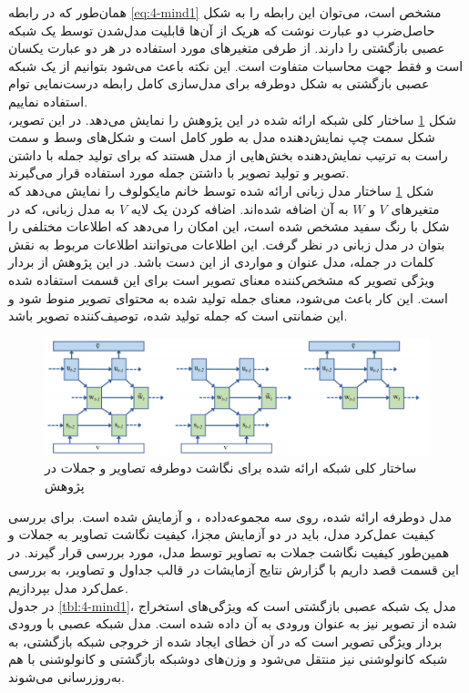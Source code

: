 همان‌طور که در رابطه \eqref{eq:4-mind1} مشخص است، می‌توان این رابطه را به شکل حاصل‌ضرب دو عبارت نوشت که هریک از آن‌ها قابلیت مدل‌شدن توسط یک شبکه عصبی بازگشتی را دارند. از طرفی متغیر‌های مورد استفاده در هر دو عبارت یکسان است و فقط جهت محاسبات متفاوت است. این نکته باعث می‌شود بتوانیم از یک شبکه عصبی بازگشتی به شکل دوطرفه برای مدل‌سازی کامل رابطه درست‌نمایی توام استفاده نماییم.
\\
شکل \ref{fig:4-mind1} ساختار کلی شبکه ارائه شده در این پژوهش را نمایش می‌دهد. در این تصویر، شکل سمت چپ نمایش‌دهنده مدل به طور کامل است و شکل‌های وسط و سمت راست به ترتیب نمایش‌دهنده بخش‌هایی از مدل هستند که برای تولید جمله با داشتن تصویر و تولید تصویر با داشتن جمله مورد استفاده قرار می‌گیرند.
\\
شکل \ref{fig:4-mind1} ساختار مدل زبانی ارائه شده توسط خانم مایکولوف را نمایش می‌دهد که متغیرهای $V$ و $W$ به آن اضافه شده‌اند. اضافه کردن یک لایه $V$ به مدل زبانی، که در شکل با رنگ سفید مشخص شده است، این امکان را می‌دهد که اطلاعات مختلفی را بتوان در مدل زبانی در نظر گرفت. این اطلاعات می‌توانند اطلاعات مربوط به نقش کلمات در جمله، مدل عنوان و مواردی از این دست باشد. در این پژوهش از بردار ویژگی تصویر که مشخص‌کننده معنای تصویر است برای این قسمت استفاده شده است. این کار باعث می‌شود، معنای جمله تولید شده به محتوای تصویر منوط شود و این ضمانتی است که جمله تولید شده، توصیف‌کننده تصویر باشد.


\begin{figure}[h]
\centering
\includegraphics[scale=0.5]{Imgs/mind1.png}
\caption{ساختار کلی شبکه ارائه شده برای نگاشت دوطرفه تصاویر و جملات در پژوهش \cite{chen2015mind}}
\label{fig:4-mind1}
\end{figure}


مدل دوطرفه ارائه شده، روی سه مجموعه‌داده‌ ،  و  آزمایش‌ شده است. برای بررسی کیفیت عمل‌کرد مدل، باید در دو آزمایش مجزا، کیفیت نگاشت تصاویر به جملات و همین‌طور کیفیت نگاشت جملات به تصاویر توسط مدل، مورد بررسی قرار گیرند. در این قسمت قصد داریم با گزارش نتایج آزمایشات در قالب جداول و تصاویر، به بررسی عمل‌کرد مدل بپردازیم. 
\\
 در جدول \ref{tbl:4-mind1}، مدل  یک شبکه عصبی بازگشتی است که ویژگی‌های استخراج شده از تصویر نیز به عنوان ورودی به آن داده شده است. مدل  شبکه عصبی با ورودی بردار ویژگی تصویر است که در آن خطای ایجاد شده از خروجی شبکه بازگشتی، به شبکه کانولوشنی نیز منتقل می‌شود و وزن‌های دوشبکه بازگشتی و کانولوشنی با هم به‌روزرسانی می‌شوند.


